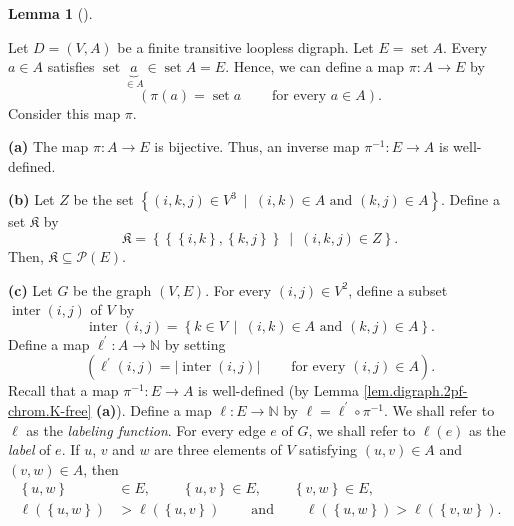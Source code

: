 \documentclass[numbers=enddot,12pt,final,onecolumn,notitlepage]{scrartcl}%
\theoremstyle{definition}
\newtheorem{lem}[theo]{Lemma}
\newenvironment{lemma}[1][]
{\begin{lem}[#1]\begin{leftbar}}
{\end{leftbar}\end{lem}}
\newenvironment{verlong}{}{}
\begin{document}
\begin{verlong}
\begin{lemma}
\label{lem.digraph.2pf-chrom.K-free}Let $D=\left(  V,A\right)  $ be a finite
transitive loopless digraph. Let $E=\operatorname*{set}A$. Every $a\in A$
satisfies $\operatorname*{set}\underbrace{a}_{\in A}\in\operatorname*{set}%
A=E$. Hence, we can define a map $\pi:A\rightarrow E$ by%
\[
\left(  \pi\left(  a\right)  =\operatorname*{set}%
a\ \ \ \ \ \ \ \ \ \ \text{for every }a\in A\right)  .
\]
Consider this map $\pi$.

\textbf{(a)} The map $\pi:A\rightarrow E$ is bijective. Thus, an inverse map
$\pi^{-1}:E\rightarrow A$ is well-defined.

\textbf{(b)} Let $Z$ be the set $\left\{  \left(  i,k,j\right)  \in
V^{3}\ \mid\ \left(  i,k\right)  \in A\text{ and }\left(  k,j\right)  \in
A\right\}  $. Define a set $\mathfrak{K}$ by
\[
\mathfrak{K}=\left\{  \left\{  \left\{  i,k\right\}  ,\left\{  k,j\right\}
\right\}  \ \mid\ \left(  i,k,j\right)  \in Z\right\}  .
\]
Then, $\mathfrak{K}\subseteq\mathcal{P}\left(  E\right)  $.

\textbf{(c)} Let $G$ be the graph $\left(  V,E\right)  $. For every $\left(
i,j\right)  \in V^{2}$, define a subset $\operatorname*{inter}\left(
i,j\right)  $ of $V$ by%
\[
\operatorname*{inter}\left(  i,j\right)  =\left\{  k\in V\ \mid\ \left(
i,k\right)  \in A\text{ and }\left(  k,j\right)  \in A\right\}  .
\]
Define a map $\ell^{\prime}:A\rightarrow\mathbb{N}$ by setting%
\[
\left(  \ell^{\prime}\left(  i,j\right)  =\left\vert \operatorname*{inter}%
\left(  i,j\right)  \right\vert \ \ \ \ \ \ \ \ \ \ \text{for every }\left(
i,j\right)  \in A\right)  .
\]
Recall that a map $\pi^{-1}:E\rightarrow A$ is well-defined (by Lemma
\ref{lem.digraph.2pf-chrom.K-free} \textbf{(a)}). Define a map $\ell
:E\rightarrow\mathbb{N}$ by $\ell=\ell^{\prime}\circ\pi^{-1}$. We shall refer
to $\ell$ as the \emph{labeling function}. For every edge $e$ of $G$, we shall
refer to $\ell\left(  e\right)  $ as the \emph{label} of $e$. If $u$, $v$ and
$w$ are three elements of $V$ satisfying $\left(  u,v\right)  \in A$ and
$\left(  v,w\right)  \in A$, then%
\begin{align}
\left\{  u,w\right\}   &  \in E,\ \ \ \ \ \ \ \ \ \ \left\{  u,v\right\}  \in
E,\ \ \ \ \ \ \ \ \ \ \left\{  v,w\right\}  \in
E,\label{eq.lem.digraph.2pf-chrom.K-free.c.1}\\
\ell\left(  \left\{  u,w\right\}  \right)   &  >\ell\left(  \left\{
u,v\right\}  \right)  \ \ \ \ \ \ \ \ \ \ \text{and}\ \ \ \ \ \ \ \ \ \ \ell
\left(  \left\{  u,w\right\}  \right)  >\ell\left(  \left\{  v,w\right\}
\right)  . \label{eq.lem.digraph.2pf-chrom.K-free.c.2}%
\end{align}



\end{lemma}
\end{verlong}
\end{document}
